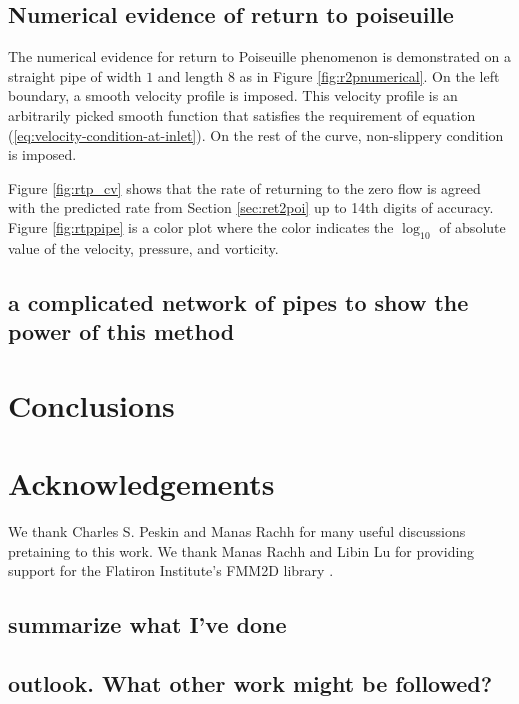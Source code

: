 \documentclass[10pt,twocolumn,letterpaper]{article}
\begin{document}
\subsection{Numerical evidence of return to poiseuille}

The numerical evidence for return to Poiseuille phenomenon is demonstrated on a
straight pipe of width $1$ and length $8$ as in Figure \ref{fig:r2pnumerical}.
On the left boundary, a smooth velocity profile is imposed. This velocity
profile is an arbitrarily picked smooth function that satisfies the requirement
of equation (\ref{eq:velocity-condition-at-inlet}). On the rest of the curve,
non-slippery condition is imposed.

Figure \ref{fig:rtp_cv} shows that the rate of returning to the zero flow is
agreed with the predicted rate from Section \ref{sec:ret2poi} up to 14th digits
of accuracy. Figure \ref{fig:rtppipe} is a color plot where the color indicates
the $\log_{10}$ of absolute value of the velocity, pressure, and vorticity.

\subsection{a complicated network of pipes to show the power of this method}

\section{Conclusions\label{sec:conclusions}}

\section{Acknowledgements\label{sec:acknowledgements}}

We thank Charles S. Peskin and Manas Rachh for many useful discussions
pretaining to this work. We thank Manas Rachh and Libin Lu for providing
support for the Flatiron Institute's FMM2D library
\cite{FlatironinstituteFmm2d2022}.

\subsection{summarize what I've done}
\subsection{outlook. What other work might be followed?}


\end{document}
